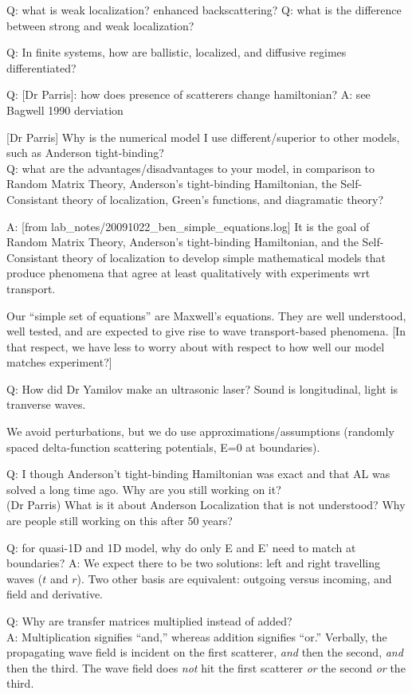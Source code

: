 \documentclass[12pt]{report} %
\begin{document}
Q: what is weak localization? enhanced backscattering? 
Q: what is the difference between strong and weak localization?

Q: In finite systems, how are ballistic, localized, and diffusive regimes differentiated?


Q: [Dr Parris]: how does presence of scatterers change hamiltonian? 
A: see Bagwell 1990 derviation


[Dr Parris] Why is the numerical model I use different/superior to other models, such as Anderson tight-binding? \\
Q: what are the advantages/disadvantages to your model, in comparison to Random Matrix Theory, Anderson's tight-binding Hamiltonian, the Self-Consistant theory of localization, Green's functions, and diagramatic theory?

A: [from lab\_notes/20091022\_ben\_simple\_equations.log]
It is the goal of Random Matrix Theory, Anderson's tight-binding Hamiltonian, and the Self-Consistant theory of localization to develop simple mathematical models that produce phenomena that agree at least qualitatively with experiments wrt transport. 

Our ``simple set of equations'' are Maxwell's equations. They are well understood, well tested, and are expected to give rise to wave transport-based phenomena. [In that respect, we have less to worry about with respect to how well our model matches experiment?]

Q: How did Dr Yamilov make an ultrasonic laser? Sound is longitudinal, light is tranverse waves.

We avoid perturbations, but we do use approximations/assumptions (randomly spaced delta-function scattering potentials, E=0 at boundaries). 



Q: I though Anderson't tight-binding Hamiltonian was exact and that AL was solved a long time ago. Why are you still working on it? \\
(Dr Parris) What is it about Anderson Localization that is not understood? Why are people still working on this after 50 years?


Q: for quasi-1D and 1D model, why do only E and E' need to match at boundaries?
A: We expect there to be two solutions: left and right travelling waves ($t$ and $r$). Two other basis are equivalent: outgoing versus incoming, and field and derivative.


Q: Why are transfer matrices multiplied instead of added? \\
A: Multiplication signifies ``and,'' whereas addition signifies ``or.'' Verbally, the propagating wave field is incident on the first scatterer, \textit{and} then the second, \textit{and} then the third. The wave field does \textit{not} hit the first scatterer \textit{or} the second \textit{or} the third.
\end{document}
